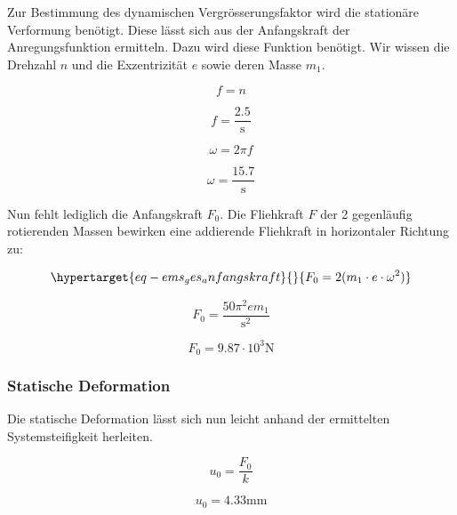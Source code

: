 \documentclass[
  letterpaper,
  DIV=11]{scrreprt}
\begin{document}
Zur Bestimmung des dynamischen Vergrösserungsfaktor wird die stationäre
Verformung benötigt. Diese lässt sich aus der Anfangskraft der
Anregungsfunktion ermitteln. Dazu wird diese Funktion benötigt. Wir
wissen die Drehzahl \(n\) und die Exzentrizität \(e\) sowie deren Masse
\(m_1\).

\begin{equation}f = n\end{equation}

\begin{equation}f = \frac{2.5}{\text{s}}\end{equation}

\begin{equation}\omega = 2 \pi f\end{equation}

\begin{equation}\omega = \frac{15.7}{\text{s}}\end{equation}

Nun fehlt lediglich die Anfangskraft \(F_0\). Die Fliehkraft \(F\) der 2
gegenläufig rotierenden Massen bewirken eine addierende Fliehkraft in
horizontaler Richtung zu:

\begin{equation}\protect\hypertarget{eq-ems_ges_anfangskraft}{}{
F_0 = 2(m_1 \cdot e \cdot \omega^2)
}\label{eq-ems_ges_anfangskraft}\end{equation}

\begin{equation}F_{0} = \frac{50 \pi^{2} e m_{1}}{\text{s}^{2}}\end{equation}

\begin{equation}F_{0} = 9.87 \cdot 10^{3} \text{N}\end{equation}

\hypertarget{statische-deformation}{%
\subsubsection{Statische Deformation}\label{statische-deformation}}

Die statische Deformation lässt sich nun leicht anhand der ermittelten
Systemsteifigkeit herleiten.

\begin{equation}u_{0} = \frac{F_{0}}{k}\end{equation}

\begin{equation}u_{0} = 4.33 \text{mm}\end{equation}
\end{document}
